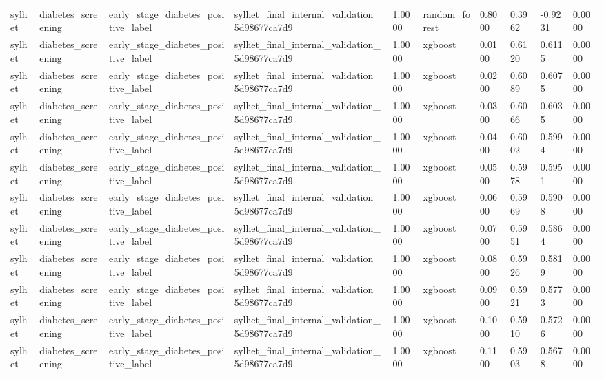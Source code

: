 \begin{tabular}{llllllllll}
sylhet & diabetes\_screening & early\_stage\_diabetes\_positive\_label & sylhet\_final\_internal\_validation\_5d98677ca7d9 & 1.0000 & random\_forest & 0.8000 & 0.3962 & -0.9231 & 0.0000 \\
sylhet & diabetes\_screening & early\_stage\_diabetes\_positive\_label & sylhet\_final\_internal\_validation\_5d98677ca7d9 & 1.0000 & xgboost & 0.0100 & 0.6120 & 0.6115 & 0.0000 \\
sylhet & diabetes\_screening & early\_stage\_diabetes\_positive\_label & sylhet\_final\_internal\_validation\_5d98677ca7d9 & 1.0000 & xgboost & 0.0200 & 0.6089 & 0.6075 & 0.0000 \\
sylhet & diabetes\_screening & early\_stage\_diabetes\_positive\_label & sylhet\_final\_internal\_validation\_5d98677ca7d9 & 1.0000 & xgboost & 0.0300 & 0.6066 & 0.6035 & 0.0000 \\
sylhet & diabetes\_screening & early\_stage\_diabetes\_positive\_label & sylhet\_final\_internal\_validation\_5d98677ca7d9 & 1.0000 & xgboost & 0.0400 & 0.6002 & 0.5994 & 0.0000 \\
sylhet & diabetes\_screening & early\_stage\_diabetes\_positive\_label & sylhet\_final\_internal\_validation\_5d98677ca7d9 & 1.0000 & xgboost & 0.0500 & 0.5978 & 0.5951 & 0.0000 \\
sylhet & diabetes\_screening & early\_stage\_diabetes\_positive\_label & sylhet\_final\_internal\_validation\_5d98677ca7d9 & 1.0000 & xgboost & 0.0600 & 0.5969 & 0.5908 & 0.0000 \\
sylhet & diabetes\_screening & early\_stage\_diabetes\_positive\_label & sylhet\_final\_internal\_validation\_5d98677ca7d9 & 1.0000 & xgboost & 0.0700 & 0.5951 & 0.5864 & 0.0000 \\
sylhet & diabetes\_screening & early\_stage\_diabetes\_positive\_label & sylhet\_final\_internal\_validation\_5d98677ca7d9 & 1.0000 & xgboost & 0.0800 & 0.5926 & 0.5819 & 0.0000 \\
sylhet & diabetes\_screening & early\_stage\_diabetes\_positive\_label & sylhet\_final\_internal\_validation\_5d98677ca7d9 & 1.0000 & xgboost & 0.0900 & 0.5921 & 0.5773 & 0.0000 \\
sylhet & diabetes\_screening & early\_stage\_diabetes\_positive\_label & sylhet\_final\_internal\_validation\_5d98677ca7d9 & 1.0000 & xgboost & 0.1000 & 0.5910 & 0.5726 & 0.0000 \\
sylhet & diabetes\_screening & early\_stage\_diabetes\_positive\_label & sylhet\_final\_internal\_validation\_5d98677ca7d9 & 1.0000 & xgboost & 0.1100 & 0.5903 & 0.5678 & 0.0000 \\

\end{tabular}
